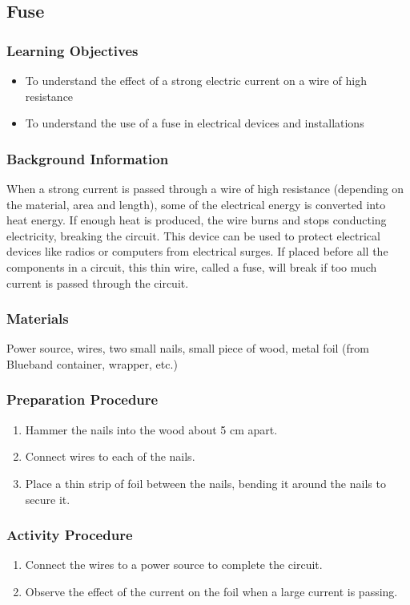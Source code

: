 \subsection{Fuse}

\subsubsection*{Learning Objectives}
\begin{itemize}
\item{To understand the effect of a strong electric current on a wire of high resistance}
\item{To understand the use of a fuse in electrical devices and installations}
\end{itemize}

\subsubsection*{Background Information}
When a strong current is passed through a wire of high resistance (depending on the material, area and length), some of the electrical energy is converted into heat energy.  If enough heat is produced, the wire burns and stops conducting electricity, breaking the circuit.  This device can be used to protect electrical devices like radios or computers from electrical surges.  If placed before all the components in a circuit, this thin wire, called a fuse, will break if too much current is passed through the circuit.

\subsubsection*{Materials}
Power source, wires, two small nails, small piece of wood, metal foil (from Blueband container, wrapper, etc.)

\subsubsection*{Preparation Procedure}
\begin{enumerate}
\item{Hammer the nails into the wood about 5 cm apart.}
\item{Connect wires to each of the nails.}
\item{Place a thin strip of foil between the nails, bending it around the nails to secure it.}
\end{enumerate}

\subsubsection*{Activity Procedure}
\begin{enumerate}
\item{Connect the wires to a power source to complete the circuit.}
\item{Observe the effect of the current on the foil when a large current is passing.}
\end{enumerate}

